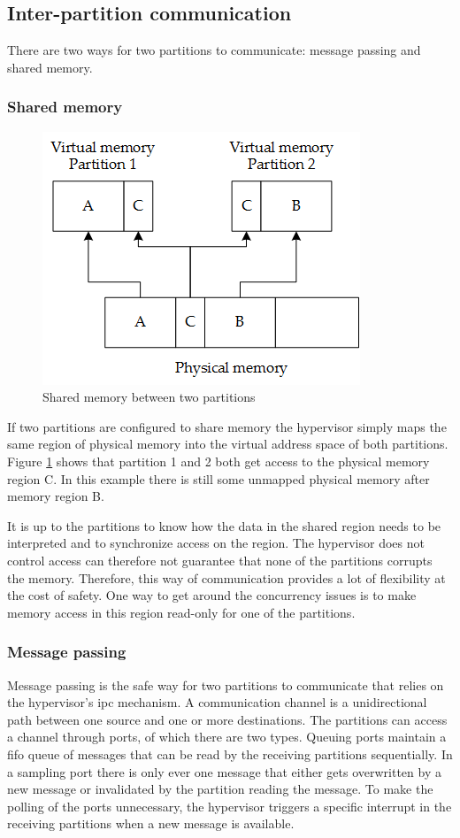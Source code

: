 \subsection{Inter-partition communication}
There are two ways for two partitions to communicate: message passing and shared memory.

\subsubsection{Shared memory}
\begin{figure}[hbt!]
\centering
\includegraphics[scale=0.75]{Figures/shared_memory.png}
\decoRule
\caption{Shared memory between two partitions}
\label{fig:shared_memory}
\end{figure}
If two partitions are configured to share memory the hypervisor simply maps the same region of physical memory into the virtual address space of both partitions. Figure \ref{fig:shared_memory} shows that partition 1 and 2 both get access to the physical memory region C. In this example there is still some unmapped physical memory after memory region B. 

It is up to the partitions to know how the data in the shared region needs to be interpreted and to synchronize access on the region. The hypervisor does not control access can therefore not guarantee that none of the partitions corrupts the memory. Therefore, this way of communication provides a lot of flexibility at the cost of safety.
One way to get around the concurrency issues is to make memory access in this region read-only for one of the partitions.

\subsubsection{Message passing}
Message passing is the safe way for two partitions to communicate that relies on the hypervisor's \acrshort{ipc} mechanism. A communication channel is a unidirectional path between one source and one or more destinations. The partitions can access a channel through ports, of which there are two types. Queuing ports maintain a \acrshort{fifo} queue of messages that can be read by the receiving partitions sequentially. In a sampling port there is only ever one message that either gets overwritten by a new message or invalidated by the partition reading the message. To make the polling of the ports unnecessary, the hypervisor triggers a specific interrupt in the receiving partitions when a new message is available.

